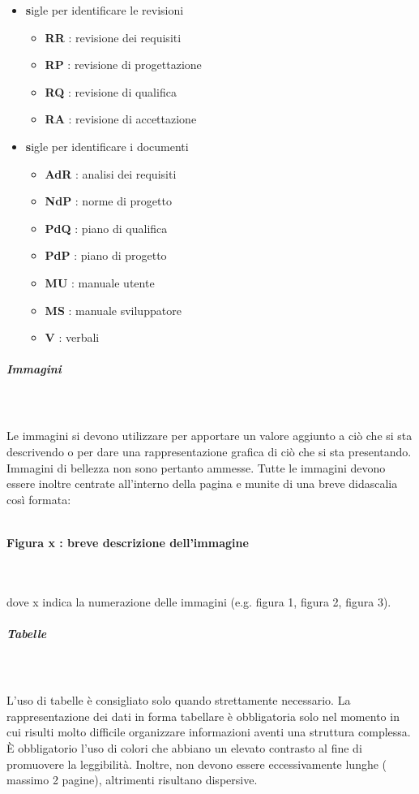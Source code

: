 \documentclass[../norme-di-progetto.tex]{subfiles}
\begin{document}
\begin{itemize}
	\item\textbf sigle per identificare le revisioni
	\begin{itemize}
		\item \textbf{RR} : revisione dei requisiti
		\item \textbf{RP} : revisione di progettazione
		\item \textbf{RQ} : revisione di qualifica
		\item \textbf{RA} : revisione di accettazione
	\end{itemize}
	\item\textbf sigle per identificare i documenti
	\begin{itemize}
		\item \textbf{AdR} : analisi dei requisiti
		\item \textbf{NdP} : norme di progetto
		\item \textbf{PdQ} : piano di qualifica
		\item \textbf{PdP} : piano di progetto
		\item \textbf{MU} : manuale utente
		\item \textbf{MS} : manuale sviluppatore
		\item \textbf{V} : verbali
 	\end{itemize}
 \end{itemize}
\subparagraph{Immagini}\mbox{}\\
\label{subp:immagini}
\\Le immagini si devono utilizzare per apportare un valore aggiunto a ciò che si sta descrivendo o per dare una rappresentazione grafica di ciò che si sta presentando. Immagini di bellezza non sono pertanto ammesse. Tutte le immagini devono essere inoltre centrate all'interno della pagina e munite di una breve didascalia così formata: \\\\\centerline{\textbf{Figura x : breve descrizione dell'immagine}} \\\\ dove x indica la numerazione delle immagini (e.g. figura 1, figura 2, figura 3).
\subparagraph{Tabelle}\mbox{}\\
\label{subp:tabelle}
\\L'uso di tabelle è consigliato solo quando strettamente necessario. La rappresentazione dei dati in forma tabellare è obbligatoria solo nel momento in cui risulti molto difficile organizzare informazioni aventi una struttura complessa. È obbligatorio l'uso di colori che abbiano un elevato contrasto al fine di promuovere la leggibilità. Inoltre, non devono essere eccessivamente lunghe ( massimo 2 pagine), altrimenti risultano dispersive.
\end{document}
